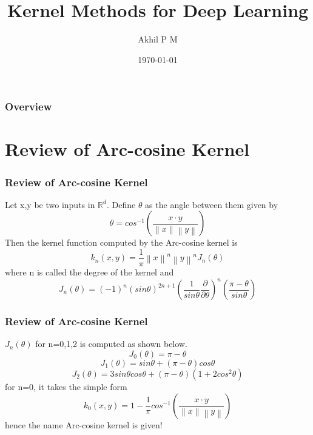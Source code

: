 \documentclass{beamer}
\title[KM for DL]{Kernel Methods for Deep Learning} %
\author{Akhil P M} %
\institute[] %
{
Supervisor : Sumitra S \\ %
}
\date{\today} %
\begin{document}
\begin{frame}
\titlepage %
\end{frame}

\begin{frame}
\frametitle{Overview} %
\tableofcontents %
\end{frame}


\section{Review of Arc-cosine Kernel} %
\begin{frame}
\frametitle{Review of Arc-cosine Kernel}
Let x,y be two inputs in $\mathbb{R}^d$. Define $\theta$ as the angle between them given by
\[ \theta = cos^{-1}\left ( \frac{x\cdot y}{\left \| x \right \| \left \| y \right \|} \right ) \]
Then the kernel function computed by the Arc-cosine kernel is
\[ k_n(x,y) = \frac{1}{\pi}\left \| x \right \|^n \left \| y \right \|^n J_n(\theta) \]
where n is called the degree of the kernel and
\[ J_n(\theta) = (-1)^n(sin\theta)^{2n+1} \left ( \frac{1}{sin\theta} \frac{\partial}{\partial \theta} \right )^n \left ( \frac{\pi-\theta}{sin\theta} \right ) \]

\end{frame}

\begin{frame}
\frametitle{Review of Arc-cosine Kernel}
$J_n(\theta)$ for n=0,1,2 is computed as shown below.
\[ J_0(\theta) = \pi-\theta \]
\[ J_1(\theta) = sin\theta + (\pi-\theta)cos\theta \]
\[ J_2(\theta) = 3sin\theta cos\theta + (\pi-\theta)(1+2cos^2\theta) \]
for n=0, it takes the simple form
\[k_0(x,y) =  1- \frac{1}{\pi}cos^{-1}\left ( \frac{x\cdot y}{\left \| x \right \| \left \| y \right \|} \right )  \]
hence the name Arc-cosine kernel is given!
\end{frame}
\end{document}
